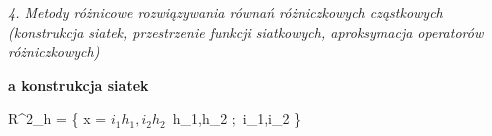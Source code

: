 \textit{4. Metody różnicowe rozwiązywania równań różniczkowych cząstkowych (konstrukcja siatek, przestrzenie funkcji siatkowych, aproksymacja operatorów różniczkowych)}

\textbf{a\) konstrukcja siatek}

R^{2}_{h} = \{ x = \(i_{1}h_{1}, i_{2}h_{2}\)\ h_{1},h_{2} ;\ i_{1},i_{2} \in {}\}